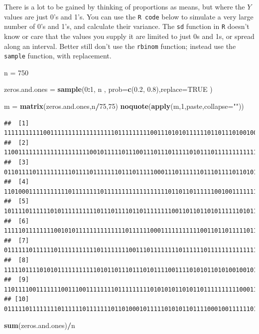 \documentclass[]{book}
\newenvironment{Shaded}{\begin{snugshade}}{\end{snugshade}}
\newcommand{\DataTypeTok}[1]{\textcolor[rgb]{0.13,0.29,0.53}{#1}}
\newcommand{\DecValTok}[1]{\textcolor[rgb]{0.00,0.00,0.81}{#1}}
\newcommand{\FloatTok}[1]{\textcolor[rgb]{0.00,0.00,0.81}{#1}}
\newcommand{\KeywordTok}[1]{\textcolor[rgb]{0.13,0.29,0.53}{\textbf{#1}}}
\newcommand{\NormalTok}[1]{#1}
\newcommand{\OperatorTok}[1]{\textcolor[rgb]{0.81,0.36,0.00}{\textbf{#1}}}
\newcommand{\OtherTok}[1]{\textcolor[rgb]{0.56,0.35,0.01}{#1}}
\newcommand{\StringTok}[1]{\textcolor[rgb]{0.31,0.60,0.02}{#1}}
\begin{document}
There is a lot to be gained by thinking of proportions as means, but where the \(Y\) values are just 0's and 1's. You can use the \texttt{R\ code} below to simulate a very large number of 0's and 1's, and calculate their variance. The \texttt{sd} function in \texttt{R} doesn't know or care that the values you supply it are limited to just 0s and 1s, or spread along an interval. Better still don't use the \texttt{rbinom} function; instead use the \texttt{sample} function, with replacement.

\begin{Shaded}
\begin{Highlighting}[]
\NormalTok{n =}\StringTok{ }\DecValTok{750}

\NormalTok{zeros.and.ones =}\StringTok{ }\KeywordTok{sample}\NormalTok{(}\DecValTok{0}\OperatorTok{:}\DecValTok{1}\NormalTok{, n , }
   \DataTypeTok{prob=}\KeywordTok{c}\NormalTok{(}\FloatTok{0.2}\NormalTok{, }\FloatTok{0.8}\NormalTok{),}\DataTypeTok{replace=}\OtherTok{TRUE}\NormalTok{ )}

\NormalTok{m =}\StringTok{ }\KeywordTok{matrix}\NormalTok{(zeros.and.ones,n}\OperatorTok{/}\DecValTok{75}\NormalTok{,}\DecValTok{75}\NormalTok{)}
\KeywordTok{noquote}\NormalTok{(}\KeywordTok{apply}\NormalTok{(m,}\DecValTok{1}\NormalTok{,paste,}\DataTypeTok{collapse=}\StringTok{""}\NormalTok{))}
\end{Highlighting}
\end{Shaded}

\begin{verbatim}
##  [1] 111111111110011111111111111111101111111110011101010111111011011101001000110
##  [2] 110011111111111111111111001011111011100111011101111101011101111111111111011
##  [3] 011011110111111111101111011111110111011111000111011111101110111101101011101
##  [4] 110100011111111111011111111011111111111111111101101101111110010011111111111
##  [5] 101111011111101011111111110111011110110111111110011011011010111111010111111
##  [6] 111110111111110010101111111111111101111110001111111111100110110111110110111
##  [7] 011111101111110111111111110111111110011101111111101111110111111111111110011
##  [8] 111110111101010111111111110101101110111010111100111101010110101001001010100
##  [9] 110111100111111100111001111111101111111110101010110101101111111111000111111
## [10] 011111011111111011111101111111011010001011111010101101111000100111111011111
\end{verbatim}

\begin{Shaded}
\begin{Highlighting}[]
\KeywordTok{sum}\NormalTok{(zeros.and.ones)}\OperatorTok{/}\NormalTok{n}
\end{Highlighting}
\end{Shaded}
\end{document}
